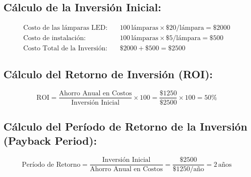 \documentclass{article}
\begin{document}
\subsection*{Cálculo de la Inversión Inicial:}
\begin{align*}
\text{Costo de las lámparas LED:} & \quad 100 \, \text{lámparas} \times \$20/\text{lámpara} = \$2000 \\
\text{Costo de instalación:} & \quad 100 \, \text{lámparas} \times \$5/\text{lámpara} = \$500 \\
\text{Costo Total de la Inversión:} & \quad \$2000 + \$500 = \$2500
\end{align*}

\subsection*{Cálculo del Retorno de Inversión (ROI):}
\[
\text{ROI} = \frac{\text{Ahorro Anual en Costos}}{\text{Inversión Inicial}} \times 100 = \frac{\$1250}{\$2500} \times 100 = 50\%
\]

\subsection*{Cálculo del Período de Retorno de la Inversión (Payback Period):}
\[
\text{Período de Retorno} = \frac{\text{Inversión Inicial}}{\text{Ahorro Anual en Costos}} = \frac{\$2500}{\$1250/\text{año}} = 2 \, \text{años}
\]
\end{document}
